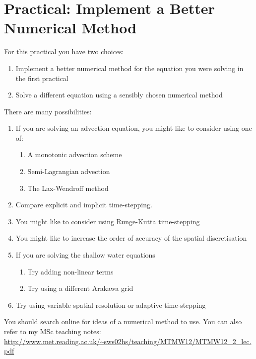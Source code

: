 %
\clearpage{}


\section{Practical: Implement a Better Numerical Method }

For this practical you have two choices:
\begin{enumerate}
\item Implement a better numerical method for the equation you were solving
in the first practical
\item Solve a different equation using a sensibly chosen numerical method
\end{enumerate}
There are many possibilities:
\begin{enumerate}
\item If you are solving an advection equation, you might like to consider
using one of:

\begin{enumerate}
\item A monotonic advection scheme
\item Semi-Lagrangian advection
\item The Lax-Wendroff method
\end{enumerate}
\item Compare explicit and implicit time-stepping.
\item You might like to consider using Runge-Kutta time-stepping
\item You might like to increase the order of accuracy of the spatial discretisation
\item If you are solving the shallow water equations

\begin{enumerate}
\item Try adding non-linear terms
\item Try using a different Arakawa grid
\end{enumerate}
\item Try using variable spatial resolution or adaptive time-stepping
\end{enumerate}
You should search online for ideas of a numerical method to use. You
can also refer to my MSc teaching notes:\\
 \url{http://www.met.reading.ac.uk/~sws02hs/teaching/MTMW12/MTMW12_2_lec.pdf}%


